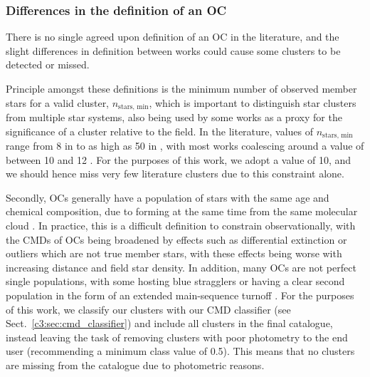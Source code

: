 \subsubsection{Differences in the definition of an OC}\label{c3:sec:discussion-undetected:methodological-reasons:2-definition}

There is no single agreed upon definition of an OC in the literature, and the slight differences in definition between works could cause some clusters to be detected or missed.

Principle amongst these definitions is the minimum number of observed member stars for a valid cluster, $n_\text{stars, min}$, which is important to distinguish star clusters from multiple star systems, also being used by some works as a proxy for the significance of a cluster relative to the field. In the literature, values of $n_\text{stars, min}$ range from 8 in \cite{castro-ginard_hunting_2022} to as high as 50 in \cite{liu_catalog_2019}, with most works coalescing around a value of between 10 and 12 \citep{krumholz_star_2019}. For the purposes of this work, we adopt a value of 10, and we should hence miss very few literature clusters due to this constraint alone.

Secondly, OCs generally have a population of stars with the same age and chemical composition, due to forming at the same time from the same molecular cloud \citep{cantat-gaudin_milky_2022}. In practice, this is a difficult definition to constrain observationally, with the CMDs of OCs being broadened by effects such as differential extinction or outliers which are not true member stars, with these effects being worse with increasing distance and field star density. In addition, many OCs are not perfect single populations, with some hosting blue stragglers or having a clear second population in the form of an extended main-sequence turnoff \citep{cantat-gaudin_milky_2022}. For the purposes of this work, we classify our clusters with our CMD classifier (see Sect.~\ref{c3:sec:cmd_classifier}) and include all clusters in the final catalogue, instead leaving the task of removing clusters with poor photometry to the end user (recommending a minimum class value of 0.5). This means that no clusters are missing from the catalogue due to photometric reasons.


